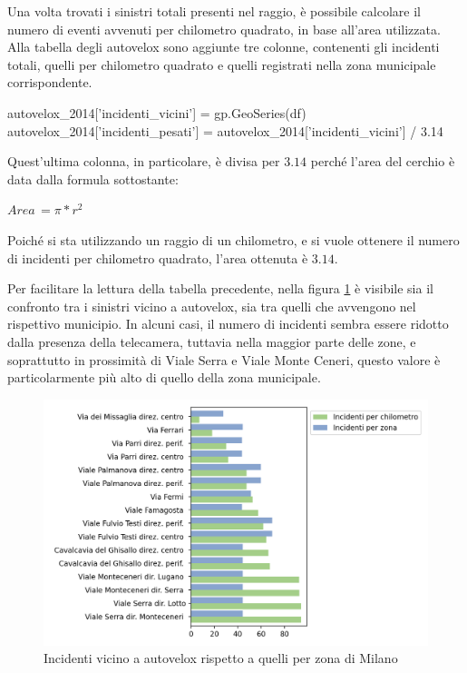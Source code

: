 \documentclass[a4paper,12pt]{report}
\begin{document}

Una volta trovati i sinistri totali presenti nel raggio, 
è possibile calcolare il numero di eventi avvenuti per chilometro quadrato, 
in base all'area utilizzata. 
Alla tabella degli autovelox sono aggiunte tre colonne, contenenti gli incidenti totali, 
quelli per chilometro quadrato e quelli registrati nella zona municipale corrispondente. 

\begin{code}
autovelox_2014['incidenti_vicini'] = gp.GeoSeries(df)
autovelox_2014['incidenti_pesati'] = autovelox_2014['incidenti_vicini'] / 3.14
\end{code}

Quest'ultima colonna, in particolare, è divisa per $3.14$ perché l'area del cerchio 
è data dalla formula sottostante: 

\begin{center}
    $Area\, = \pi * r^2$
\end{center}

Poiché si sta utilizzando un raggio di un chilometro, e si vuole ottenere il 
numero di incidenti per chilometro quadrato, l'area ottenuta è $3.14$. 

Per facilitare la lettura della tabella precedente, nella figura \ref{fig:confronto-autovelox} 
è visibile sia il confronto tra i sinistri vicino a autovelox, 
sia tra quelli che avvengono nel rispettivo municipio. 
In alcuni casi, il numero di incidenti sembra essere ridotto dalla presenza 
della telecamera,  
tuttavia nella maggior parte delle zone, e soprattutto in prossimità di Viale Serra e 
Viale Monte Ceneri, questo valore è particolarmente più alto di 
quello della zona municipale. 

\begin{figure}
    \includegraphics[width=\linewidth]{../src/autovelox/conclusioni_autovelox.png}
    \caption{Incidenti vicino a autovelox rispetto a quelli per zona di Milano}
    \label{fig:confronto-autovelox}
\end{figure}
\end{document}
